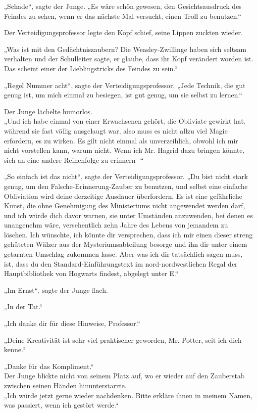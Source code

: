 {„Schade“, sagte der Junge. „Es wäre schön gewesen, den Gesichtsausdruck des Feindes zu sehen, wenn er das nächste Mal versucht, einen Troll zu benutzen.“

Der Verteidigungsprofessor legte den Kopf schief, seine Lippen zuckten wieder.

„Was ist mit den Gedächtniszaubern? Die Weasley-Zwillinge haben sich seltsam verhalten und der Schulleiter sagte, er glaube, dass ihr Kopf verändert worden ist. Das scheint einer der Lieblingstricks des Feindes zu sein.“

„Regel Nummer acht“, sagte der Verteidigungsprofessor. „Jede Technik, die gut genug ist, um mich einmal zu besiegen, ist gut genug, um sie selbst zu lernen.“

Der Junge lächelte humorlos.\\ „Und ich habe einmal von einer Erwachsenen gehört, die Obliviate gewirkt hat, während sie fast völlig ausgelaugt war, also muss es nicht allzu viel Magie erfordern, es zu wirken. Es gilt nicht einmal als unverzeihlich, obwohl ich mir nicht vorstellen kann, warum nicht. Wenn ich Mr. Hagrid dazu bringen könnte, sich an eine andere Reihenfolge zu erinnern -“

„So einfach ist das nicht“, sagte der Verteidigungsprofessor. „Du bist nicht stark genug, um den Falsche-Erinnerung-Zauber zu benutzen, und selbst eine einfache Obliviation wird deine derzeitige Ausdauer überfordern. Es ist eine gefährliche Kunst, die ohne Genehmigung des Ministeriums nicht angewendet werden darf, und ich würde dich davor warnen, sie unter Umständen anzuwenden, bei denen es unangenehm wäre, versehentlich zehn Jahre des Lebens von jemandem zu löschen. Ich wünschte, ich könnte dir versprechen, dass ich mir einen dieser streng gehüteten Wälzer aus der Mysteriumsabteilung besorge und ihn dir unter einem getarnten Umschlag zukommen lasse. Aber was ich dir tatsächlich sagen muss, ist, dass du den Standard-Einführungstext im nord-nordwestlichen Regal der Hauptbibliothek von Hogwarts findest, abgelegt unter E.“

„Im Ernst“, sagte der Junge flach.

„In der Tat.“

„Ich danke dir für diese Hinweise, Professor.“

„Deine Kreativität ist sehr viel praktischer geworden, Mr. Potter, seit ich dich kenne.“

„Danke für das Kompliment.“\\ Der Junge blickte nicht von seinem Platz auf, wo er wieder auf den Zauberstab zwischen seinen Händen hinunterstarrte.\\ „Ich würde jetzt gerne wieder nachdenken. Bitte erkläre ihnen in meinem Namen, was passiert, wenn ich gestört werde.“

}
